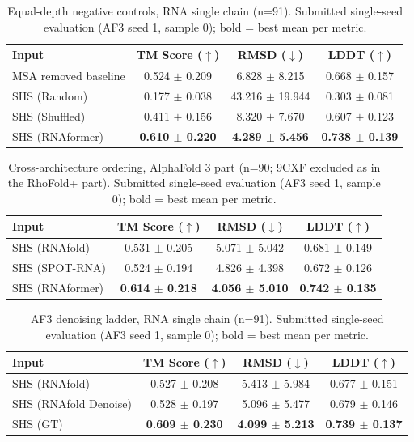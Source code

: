 \begin{table}[htbp]
\centering
\caption{Equal-depth negative controls, RNA single chain (n=91). Submitted single-seed evaluation (AF3 seed 1, sample 0); bold = best mean per metric.}
\label{tab:rna_single_chain_shuffle}
\begin{tabular}{lccc}
\toprule
Input & TM Score ($\uparrow$) & RMSD ($\downarrow$) & LDDT ($\uparrow$) \\
\midrule
MSA removed baseline & 0.524 $\pm$ 0.209 & 6.828 $\pm$ 8.215 & 0.668 $\pm$ 0.157 \\
SHS (Random) & 0.177 $\pm$ 0.038 & 43.216 $\pm$ 19.944 & 0.303 $\pm$ 0.081 \\
SHS (Shuffled) & 0.411 $\pm$ 0.156 & 8.320 $\pm$ 7.670 & 0.607 $\pm$ 0.123 \\
SHS (RNAformer) & \textbf{0.610 $\pm$ 0.220} & \textbf{4.289 $\pm$ 5.456} & \textbf{0.738 $\pm$ 0.139} \\
\bottomrule
\end{tabular}
\end{table}

\begin{table}[htbp]
\centering
\caption{Cross-architecture ordering, AlphaFold 3 part (n=90; 9CXF excluded as in the RhoFold+ part). Submitted single-seed evaluation (AF3 seed 1, sample 0); bold = best mean per metric.}
\label{tab:order_rna_single_chain_af3}
\begin{tabular}{lccc}
\toprule
Input & TM Score ($\uparrow$) & RMSD ($\downarrow$) & LDDT ($\uparrow$) \\
\midrule
SHS (RNAfold) & 0.531 $\pm$ 0.205 & 5.071 $\pm$ 5.042 & 0.681 $\pm$ 0.149 \\
SHS (SPOT-RNA) & 0.524 $\pm$ 0.194 & 4.826 $\pm$ 4.398 & 0.672 $\pm$ 0.126 \\
SHS (RNAformer) & \textbf{0.614 $\pm$ 0.218} & \textbf{4.056 $\pm$ 5.010} & \textbf{0.742 $\pm$ 0.135} \\
\bottomrule
\end{tabular}
\end{table}

\begin{table}[htbp]
\centering
\caption{AF3 denoising ladder, RNA single chain (n=91). Submitted single-seed evaluation (AF3 seed 1, sample 0); bold = best mean per metric.}
\label{tab:denoise_main}
\begin{tabular}{lccc}
\toprule
Input & TM Score ($\uparrow$) & RMSD ($\downarrow$) & LDDT ($\uparrow$) \\
\midrule
SHS (RNAfold) & 0.527 $\pm$ 0.208 & 5.413 $\pm$ 5.984 & 0.677 $\pm$ 0.151 \\
SHS (RNAfold Denoise) & 0.528 $\pm$ 0.197 & 5.096 $\pm$ 5.477 & 0.679 $\pm$ 0.146 \\
SHS (GT) & \textbf{0.609 $\pm$ 0.230} & \textbf{4.099 $\pm$ 5.213} & \textbf{0.739 $\pm$ 0.137} \\
\bottomrule
\end{tabular}
\end{table}

